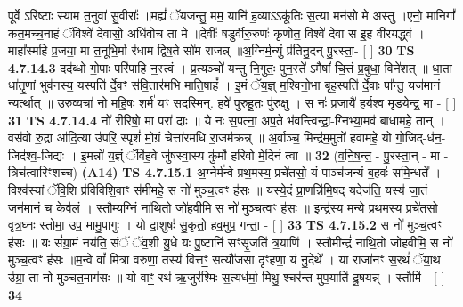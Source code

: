 \documentclass[17pt]{extarticle}
\begin{document}
                  पूर्वे ऽरि॑ष्टाः स्याम त॒नुवा॑ सु॒वीराः᳚ ॥मह्यं॑ ॅयजन्तु॒ मम॒ यानि॑ ह॒व्याऽऽकू॑तिः स॒त्या मन॑सो मे अस्तु ।एनो॒ मानिगां᳚ कत॒मच्च॒नाहं ॅविश्वे॑ देवासो॒ अधि॑वोच ता मे ॥देवीः᳚ षडुर्वीरु॒रुणः॑ कृणोत॒ विश्वे॑ देवा स इ॒ह वी॑रयद्ध्वं ।माहा᳚स्महि प्र॒जया॒ मा त॒नूभि॒र्मा र॑धाम द्विष॒ते सो॑म राजन्न् ॥अ॒ग्निर्म॒न्युं प्र॑तिनु॒दन् पु॒रस्ता॒- [  ] \textbf{  30} \newline
                  \newline
                                \textbf{ TS 4.7.14.3} \newline
                  दद॑ब्धो गो॒पाः परि॑पाहि न॒स्त्वं । प्र॒त्यञ्चो॑ यन्तु नि॒गुतः॒ पुन॒स्ते॑ ऽमैषां᳚ चि॒त्तं प्र॒बुधा॒ विने॑शत् ॥ धा॒ता धा॑तृ॒णां भुव॑नस्य॒ यस्पति॑ र्दे॒वꣳ स॑वि॒तार॑मभि माति॒षाहं᳚ । इ॒मं ॅय॒ज्ञ् म॒श्विनो॒भा बृह॒स्पति॑ र्दे॒वाः पा᳚न्तु॒ यज॑मानं न्य॒र्त्थात् ॥ उ॒रु॒व्यचा॑ नो महि॒षः शर्म॑ यꣳ सद॒स्मिन्. हवे॑ पुरुहू॒तः पु॑रु॒क्षु । स नः॑ प्र॒जायै॑ हर्यश्व मृड॒येन्द्र॒ मा - [  ] \textbf{  31} \newline
                  \newline
                                \textbf{ TS 4.7.14.4} \newline
                  नो॑ रीरिषो॒ मा परा॑ दाः ॥ ये नः॑ स॒पत्ना॒ अप॒ते भ॑वन्त्विन्द्रा॒-ग्निभ्या॒मव॑ बाधामहे॒ तान् ।वस॑वो रु॒द्रा आ॑दि॒त्या उ॑परि॒ स्पृशं॑ मो॒ग्रं चेत्ता॑रमधि रा॒जम॑क्रन्न् ॥ अ॒र्वाञ्च॒ मिन्द्र॑म॒मुतो॑ हवामहे॒ यो गो॒जिद्-ध॑न॒-जिद॑श्व॒-जिद्यः । इ॒मन्नो॑ य॒ज्ञ्ं ॅवि॑ह॒वे जु॑षस्वा॒स्य कु॑र्मो हरिवो मे॒दिनं॑ त्वा ॥ \textbf{  32 } \newline
                  \newline
                      (व॒नि॒ष॒न्त॒ - पु॒रस्ता॒न् - मा - त्रिच॑त्वारिꣳशच्च)  \textbf{(A14)} \newline \newline
                                        \textbf{ TS 4.7.15.1} \newline
                  अ॒ग्नेर्म॑न्वे प्रथ॒मस्य॒ प्रचे॑तसो॒ यं पाञ्च॑जन्यं ब॒हवः॑ समि॒न्धते᳚ । विश्व॑स्यां ॅवि॒शि प्र॑विविशि॒वाꣳ स॑मीमहे॒ स नो॑ मुञ्च॒त्वꣳ ह॑सः ॥ यस्ये॒दं प्रा॒णन्नि॑मि॒षद् यदेज॑ति॒ यस्य॑ जा॒तं जन॑मानं च॒ केव॑लं । स्तौम्य॒ग्निं ना॑थि॒तो जो॑हवीमि॒ स नो॑ मुञ्च॒त्वꣳ ह॑सः ॥ इन्द्र॑स्य मन्ये प्रथ॒मस्य॒ प्रचे॑तसो वृत्र॒घ्नः स्तोमा॒ उप॒ मामु॒पागुः॑ । यो दा॒शुषः॑ सु॒कृतो॒ हव॒मुप॒ गन्ता॒ - [  ] \textbf{  33} \newline
                  \newline
                                \textbf{ TS 4.7.15.2} \newline
                  स नो॑ मुञ्च॒त्वꣳ ह॑सः ॥ यः सं॑ग्रा॒मं नय॑ति॒ संॅ ॅव॒शी यु॒धे यः पु॒ष्टानि॑ सꣳसृ॒जति॑ त्र॒याणि॑ । स्तौमीन्द्रं॑ नाथि॒तो जो॑हवीमि॒ स नो॑ मुञ्च॒त्वꣳ ह॑सः ॥म॒न्वे वां᳚ मित्रा वरुणा॒ तस्य॑ वित्तꣳ॒॒ सत्यौ॑जसा दृꣳहणा॒ यं नु॒देथे᳚ । या राजा॑नꣳ स॒रथं॑ ॅया॒थ उ॑ग्रा॒ ता नो॑ मुञ्चत॒माग॑सः ॥ यो वाꣳ॒॒ रथ॑ ऋ॒जुर॑श्मिः स॒त्यध॑र्मा॒ मिथु॒ श्चर॑न्त-मुप॒याति॑ दू॒षयन्न्॑ । स्तौमि॑ - [  ] \textbf{  34} \newline
\end{document}
